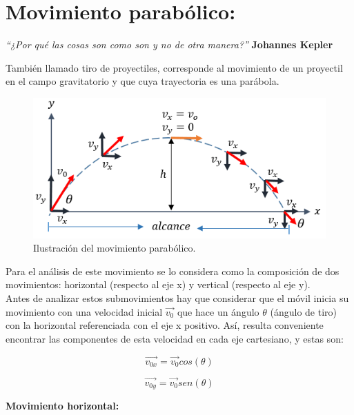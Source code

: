 \chapter{Movimiento parabólico:} 
 
\textit{``¿Por qué las cosas son como son y no de otra manera?''} \textbf{Johannes Kepler}
\vspace{1.0cm}  
 
También llamado tiro de proyectiles, corresponde al movimiento de un proyectil en el campo gravitatorio y que cuya  trayectoria 
es 
una parábola.
 
\begin{figure}[ht]
 \centering
 \includegraphics[scale=0.6]{images/movimiento_parabolico.png}
 \caption{Ilustración del movimiento parabólico.}\label{movparabola}
\end{figure}   

Para el análisis de este movimiento se lo considera como la composición de dos movimientos: horizontal (respecto al eje x) y 
vertical (respecto al eje y).\\

Antes de analizar estos submovimientos hay que considerar que el móvil inicia su movimiento con una velocidad inicial $\vec{v_0}$ 
que hace un ángulo $\theta$ (ángulo de tiro) con la horizontal referenciada con el eje x positivo. Así, resulta conveniente 
encontrar las componentes de esta velocidad en cada eje cartesiano, y estas son:

\begin{equation}
 \vec{v_{0x}}=\vec{v_0}cos(\theta)
\end{equation}

\begin{equation}
 \vec{v_{0y}}=\vec{v_0}sen(\theta)
\end{equation}

\textbf{Movimiento horizontal:}\\

